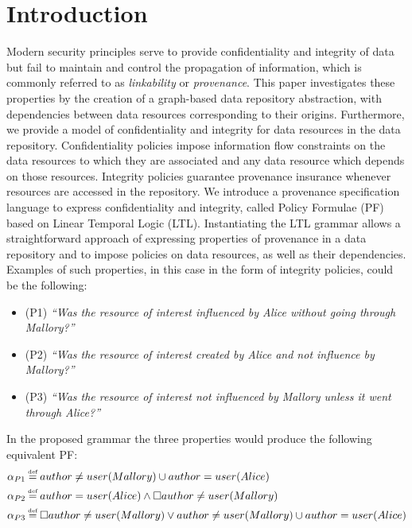 \section{Introduction}
Modern security principles serve to provide confidentiality and integrity of data but fail to maintain and control the propagation of information, which is commonly referred to as \emph{linkability} or \emph{provenance}. This paper investigates these properties by the creation of a graph-based data repository abstraction, with dependencies between data resources corresponding to their origins. Furthermore, we provide a model of confidentiality and integrity for data resources in the data repository. Confidentiality policies impose information flow constraints on the data resources to which they are associated and any data resource which depends on those resources. Integrity policies guarantee provenance insurance whenever resources are accessed in the repository. We introduce a provenance specification language to express confidentiality and integrity, called Policy Formulae (PF) based on Linear Temporal Logic (LTL). Instantiating the LTL grammar allows a straightforward approach of expressing properties of provenance in a data repository and to impose policies on data resources, as well as their dependencies. Examples of such properties, in this case in the form of integrity policies, could be the following:
\begin{itemize}
    \item (P1) \emph{``Was the resource of interest influenced by Alice without going through Mallory?''}
    \item (P2) \emph{``Was the resource of interest created by Alice and not influence by Mallory?''}
    \item (P3) \emph{``Was the resource of interest not influenced by Mallory unless it went through Alice?''}
\end{itemize}
In the proposed grammar the three properties would produce the following equivalent PF:
\begin{align*}
    \pf_{P1} &\eqdef author \neq user(Mallory) \U author = user(Alice) \\
    \pf_{P2} &\eqdef author = user(Alice) \land \G author \neq user(Mallory) \\
    \pf_{P3} &\eqdef \G author \neq user(Mallory) \lor author \neq user(Mallory) \U author = user(Alice)
\end{align*}
